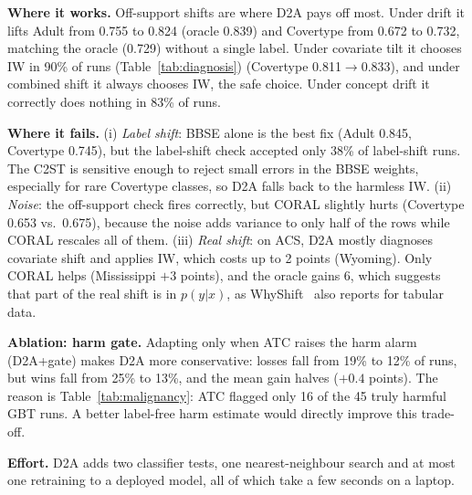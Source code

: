 \documentclass[conference]{IEEEtran}
\newcommand{\Dtwo}{\textsc{D2A}}
\begin{document}
\textbf{Where it works.} Off-support shifts are where \Dtwo{} pays off most. Under drift it lifts Adult from 0.755 to 0.824 (oracle 0.839) and Covertype from 0.672 to 0.732, matching the oracle (0.729) without a single label. Under covariate tilt it chooses IW in 90\% of runs (Table~\ref{tab:diagnosis}) (Covertype 0.811$\to$0.833), and under combined shift it always chooses IW, the safe choice. Under concept drift it correctly does nothing in 83\% of runs.

\textbf{Where it fails.} (i) \emph{Label shift}: BBSE alone is the best fix (Adult 0.845, Covertype 0.745), but the label-shift check accepted only 38\% of label-shift runs. The C2ST is sensitive enough to reject small errors in the BBSE weights, especially for rare Covertype classes, so \Dtwo{} falls back to the harmless IW. (ii) \emph{Noise}: the off-support check fires correctly, but CORAL slightly hurts (Covertype 0.653 vs.\ 0.675), because the noise adds variance to only half of the rows while CORAL rescales all of them. (iii) \emph{Real shift}: on ACS, \Dtwo{} mostly diagnoses covariate shift and applies IW, which costs up to 2 points (Wyoming). Only CORAL helps (Mississippi $+3$ points), and the oracle gains 6, which suggests that part of the real shift is in $p(y|x)$, as WhyShift~\cite{liu2023whyshift} also reports for tabular data.

\textbf{Ablation: harm gate.} Adapting only when ATC raises the harm alarm (\Dtwo{}+gate) makes \Dtwo{} more conservative: losses fall from 19\% to 12\% of runs, but wins fall from 25\% to 13\%, and the mean gain halves ($+0.4$ points). The reason is Table~\ref{tab:malignancy}: ATC flagged only 16 of the 45 truly harmful GBT runs. A better label-free harm estimate would directly improve this trade-off.

\textbf{Effort.} \Dtwo{} adds two classifier tests, one nearest-neighbour search and at most one retraining to a deployed model, all of which take a few seconds on a laptop.
\end{document}
